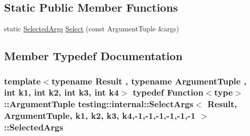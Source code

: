 \subsection*{Static Public Member Functions}
\begin{DoxyCompactItemize}
\item 
static \hyperlink{classtesting_1_1internal_1_1_select_args_3_01_result_00_01_argument_tuple_00_01k1_00_01k2_00_01k69e12b55446b1a17c0daec13dac1d86f_abe7050ab51f411bf8f15dd672b91d3be}{Selected\+Args} \hyperlink{classtesting_1_1internal_1_1_select_args_3_01_result_00_01_argument_tuple_00_01k1_00_01k2_00_01k69e12b55446b1a17c0daec13dac1d86f_a5ce36de7c221508d21378540c8e08523}{Select} (const Argument\+Tuple \&args)
\end{DoxyCompactItemize}


\subsection{Member Typedef Documentation}
\subsubsection[{\texorpdfstring{Selected\+Args}{SelectedArgs}}]{\setlength{\rightskip}{0pt plus 5cm}template$<$typename Result , typename Argument\+Tuple , int k1, int k2, int k3, int k4$>$ typedef {\bf Function}$<${\bf type}$>$\+::Argument\+Tuple {\bf testing\+::internal\+::\+Select\+Args}$<$ Result, Argument\+Tuple, k1, k2, k3, k4,-\/1,-\/1,-\/1,-\/1,-\/1,-\/1 $>$\+::{\bf Selected\+Args}}\hypertarget{classtesting_1_1internal_1_1_select_args_3_01_result_00_01_argument_tuple_00_01k1_00_01k2_00_01k69e12b55446b1a17c0daec13dac1d86f_abe7050ab51f411bf8f15dd672b91d3be}{}\label{classtesting_1_1internal_1_1_select_args_3_01_result_00_01_argument_tuple_00_01k1_00_01k2_00_01k69e12b55446b1a17c0daec13dac1d86f_abe7050ab51f411bf8f15dd672b91d3be}

